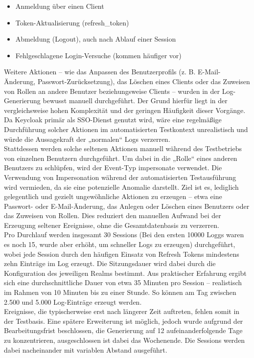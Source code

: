 \documentclass[a4paper,12pt]{article}
\begin{document}
	\begin{itemize}
		\item Anmeldung über einen Client
		\item Token-Aktualisierung (\gls{refresh_token})
		\item Abmeldung (Logout), auch nach Ablauf einer Session
		\item Fehlgeschlagene Login-Versuche (kommen häufiger vor)
	\end{itemize}
	Weitere Aktionen – wie das Anpassen des Benutzerprofils (z. B. E-Mail-Änderung, Passwort-Zurücksetzung), das Löschen eines Clients oder das Zuweisen von Rollen an andere Benutzer beziehungsweise Clients – wurden in der Log-Generierung bewusst manuell durchgeführt. Der Grund hierfür liegt in der vergleichsweise hohen Komplexität und der geringen Häufigkeit dieser Vorgänge. Da Keycloak primär als SSO-Dienst genutzt wird, wäre eine regelmäßige Durchführung solcher Aktionen im automatisierten Testkontext unrealistisch und würde die Aussagekraft der „normalen“ Logs verzerren.
	\\[0.5em]
	Stattdessen werden solche seltenen Aktionen manuell während des Testbetriebs von einzelnen Benutzern durchgeführt. Um dabei in die „Rolle“ eines anderen Benutzers zu schlüpfen, wird der Event-Typ \gls{impersonate} verwendet. Die Verwendung von Impersonation während der automatisierten Testausführung wird vermieden, da sie eine potenzielle Anomalie darstellt. Ziel ist es, lediglich gelegentlich und gezielt ungewöhnliche Aktionen zu erzeugen – etwa eine Passwort- oder E-Mail-Änderung, das Anlegen oder Löschen eines Benutzers oder das Zuweisen von Rollen. Dies reduziert den manuellen Aufwand bei der Erzeugung seltener Ereignisse, ohne die Gesamtdatenbasis zu verzerren.
	\\[0.5em]
	Pro Durchlauf werden insgesamt 30 Sessions (Bei den ersten 10000 Loggs waren es noch 15, wurde aber erhöht, um schneller Logs zu erzeugen) durchgeführt, wobei jede Session durch den häufigen Einsatz von Refresh Tokens mindestens zehn Einträge im Log erzeugt. Die Sitzungsdauer wird dabei durch die Konfiguration des jeweiligen Realms bestimmt. Aus praktischer Erfahrung ergibt sich eine durchschnittliche Dauer von etwa 35 Minuten pro Session – realistisch im Rahmen von 10 Minuten bis zu einer Stunde. So können am Tag zwischen 2.500 und 5.000 Log-Einträge erzeugt werden.
	\\[0.5em]
	Ereignisse, die typischerweise erst nach längerer Zeit auftreten, fehlen somit in der Testbasis. Eine spätere Erweiterung ist möglich, jedoch wurde aufgrund der Bearbeitungsfrist beschlossen, die Generierung auf 12 aufeinanderfolgende Tage zu konzentrieren, ausgeschlossen ist dabei das Wochenende. Die Sessions werden dabei nacheinander mit variablen Abstand ausgeführt.
		
\end{document}
